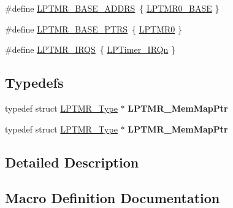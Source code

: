 \begin{DoxyCompactItemize}
\item 
\#define \hyperlink{group__LPTMR__Peripheral__Access__Layer_ga62b4c0fde534c2c09ef0c30b3c4bb0e3}{L\+P\+T\+M\+R\+\_\+\+B\+A\+S\+E\+\_\+\+A\+D\+D\+RS}~\{ \hyperlink{group__LPTMR__Peripheral__Access__Layer_ga024f362857a8b928d96cf3b3f5106793}{L\+P\+T\+M\+R0\+\_\+\+B\+A\+SE} \}
\item 
\#define \hyperlink{group__LPTMR__Peripheral__Access__Layer_gac92660dedc63be48d689d43efc9f2c82}{L\+P\+T\+M\+R\+\_\+\+B\+A\+S\+E\+\_\+\+P\+T\+RS}~\{ \hyperlink{group__LPTMR__Peripheral__Access__Layer_gaba0c3bc8a32ad5a884c99e019dbdef85}{L\+P\+T\+M\+R0} \}
\item 
\#define \hyperlink{group__LPTMR__Peripheral__Access__Layer_ga5bf0032641d320fc7d486d703800c729}{L\+P\+T\+M\+R\+\_\+\+I\+R\+QS}~\{ \hyperlink{group__Interrupt__vector__numbers_gga666eb0caeb12ec0e281415592ae89083acf59a0816d3c5ff26328c886c9d3af34}{L\+P\+Timer\+\_\+\+I\+R\+Qn} \}
\end{DoxyCompactItemize}
\subsection*{Typedefs}
\begin{DoxyCompactItemize}
\item 
typedef struct \hyperlink{structLPTMR__Type}{L\+P\+T\+M\+R\+\_\+\+Type} $\ast$ {\bfseries L\+P\+T\+M\+R\+\_\+\+Mem\+Map\+Ptr}\hypertarget{group__LPTMR__Peripheral__Access__Layer_ga52c31e0582a47d2a19155fb601b708ce}{}\label{group__LPTMR__Peripheral__Access__Layer_ga52c31e0582a47d2a19155fb601b708ce}

\item 
typedef struct \hyperlink{structLPTMR__Type}{L\+P\+T\+M\+R\+\_\+\+Type} $\ast$ {\bfseries L\+P\+T\+M\+R\+\_\+\+Mem\+Map\+Ptr}\hypertarget{group__LPTMR__Peripheral__Access__Layer_ga52c31e0582a47d2a19155fb601b708ce}{}\label{group__LPTMR__Peripheral__Access__Layer_ga52c31e0582a47d2a19155fb601b708ce}

\end{DoxyCompactItemize}


\subsection{Detailed Description}


\subsection{Macro Definition Documentation}
